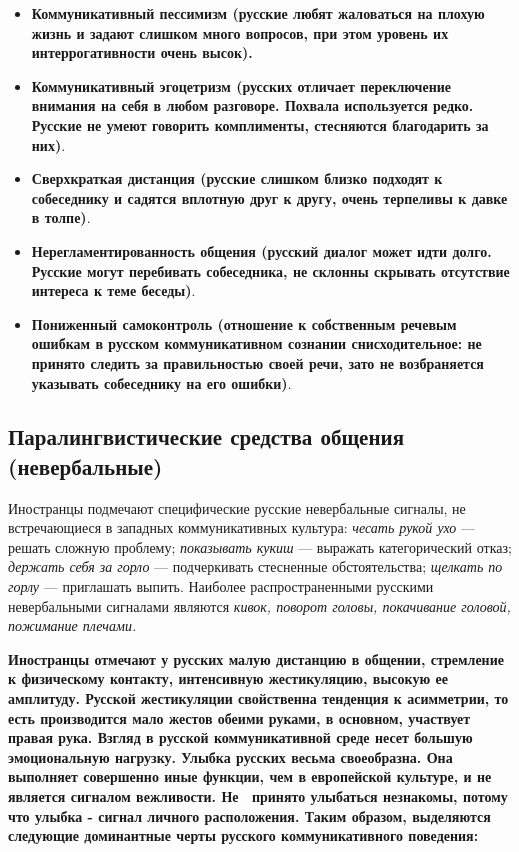 \begin{itemize}
\item {\bfseries
Коммуникативный пессимизм \textmd{(русские любят жаловаться на плохую жизнь и задают слишком много вопросов, при этом уровень их интеррогативности очень высок).}}
\item {\bfseries
Коммуникативный эгоцетризм \textmd{(русских отличает переключение внимания на себя в любом разговоре. Похвала используется редко. Русские не умеют говорить комплименты, стесняются благодарить за них)}}.
\item {\bfseries
Сверхкраткая дистанция \textmd{(русские слишком близко подходят к собеседнику и садятся вплотную друг к другу, очень терпеливы к давке в толпе)}}.
\item {\bfseries
Нерегламентированность общения \textmd{(русский диалог может идти долго. Русские могут перебивать собеседника, не склонны скрывать отсутствие интереса к теме беседы)}}.
\item {\bfseries
Пониженный самоконтроль\textmd{ (отношение к собственным речевым ошибкам в русском коммуникативном сознании снисходительное: не принято следить за правильностью своей речи, зато не возбраняется указывать собеседнику на его ошибки)}}.
\end{itemize}

\subsection*{Паралингвистические средства общения (невербальные)}
 

Иностранцы подмечают специфические русские невербальные сигналы, не встречающиеся в западных коммуникативных культура: \textit{чесать рукой ухо} --- решать сложную проблему; \textit{показывать кукиш}
--- выражать категорический отказ; \textit{держать себя за горло} --- подчеркивать стесненные обстоятельства; \textit{щелкать по горлу} --- приглашать выпить.
Наиболее распространенными русскими невербальными сигналами являются \textit{кивок, поворот головы, покачивание головой, пожимание плечами.}

{\bfseries
\textmd{Иностранцы отмечают у русских малую дистанцию в общении, стремление к физическому контакту, интенсивную жестикуляцию, высокую ее амплитуду. Русской жестикуляции свойственна тенденция к асимметрии, то есть производится мало жестов обеими руками, в основном, участвует правая рука. Взгляд в русской коммуникативной среде несет большую эмоциональную }\textmd{нагрузку. Улыбка русских весьма своеобразна. Она выполняет совершенно иные функции, чем в европейской культуре, и не является сигналом вежливости. Не \ принято улыбаться незнакомы, потому что улыбка
- сигнал личного расположения. Таким образом, выделяются следующие доминантные черты русского коммуникативного поведения:}}

